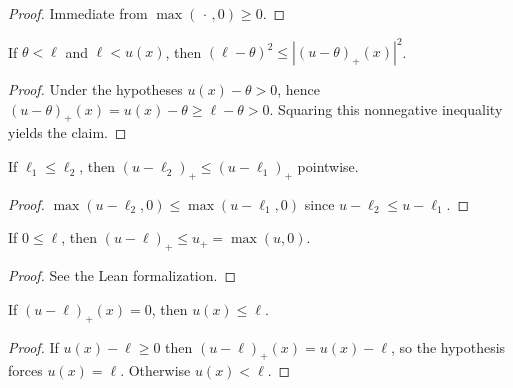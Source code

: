 \begin{proof}
\leanok

Immediate from $\max(\,\cdot\,, 0) \ge 0$.
\end{proof}

\begin{lemma}
\label{lem:positivePartSub_sq_ge_gap_sq_of_lt}
\leanok
{}
If $\theta < \ell$ and $\ell < u(x)$, then
$(\ell - \theta)^2 \le |(u-\theta)_+(x)|^2$.
\end{lemma}

\begin{proof}
\leanok

Under the hypotheses $u(x) - \theta > 0$, hence
$(u-\theta)_+(x) = u(x) - \theta \ge \ell - \theta > 0$.  Squaring this
nonnegative inequality yields the claim.
\end{proof}

\begin{lemma}
\label{lem:positivePartSub_antitone}
\leanok
{}
If $\ell_1 \le \ell_2$, then
$(u-\ell_2)_+ \le (u-\ell_1)_+$ pointwise.
\end{lemma}

\begin{proof}
\leanok

$\max(u-\ell_2, 0) \le \max(u-\ell_1, 0)$ since $u-\ell_2 \le u-\ell_1$.
\end{proof}

\begin{lemma}
\label{lem:positivePartSub_le_posPartZero}
\leanok
{}
If $0 \le \ell$, then $(u-\ell)_+ \le u_+ = \max(u,0)$.
\end{lemma}

\begin{proof}
\leanok
{}
See the Lean formalization.
\end{proof}

\begin{lemma}
\label{lem:le_of_positivePartSub_eq_zero}
\leanok
{}
If $(u-\ell)_+(x) = 0$, then $u(x) \le \ell$.
\end{lemma}

\begin{proof}
\leanok

If $u(x) - \ell \ge 0$ then $(u-\ell)_+(x) = u(x) - \ell$, so the
hypothesis forces $u(x) = \ell$.  Otherwise $u(x) < \ell$.
\end{proof}

